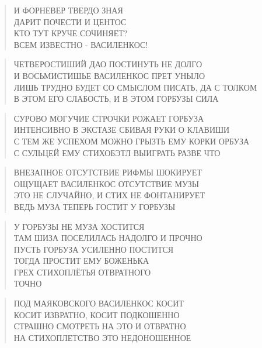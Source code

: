 \poemtitle{***}
\begin{verse}
И ФОРНЕВЕР ТВЕРДО ЗНАЯ\\
ДАРИТ ПОЧЕСТИ И ЦЕНТОС\\
КТО ТУТ КРУЧЕ СОЧИНЯЕТ?\\
ВСЕМ ИЗВЕСТНО - ВАСИЛЕНКОС!
\end{verse}

\poemtitle{***}
\begin{verse}
ЧЕТВЕРОСТИШИЙ ДАО ПОСТИНУТЬ НЕ ДОЛГО\\
И ВОСЬМИСТИШЬЕ ВАСИЛЕНКОС ПРЕТ УНЫЛО\\
ЛИШЬ ТРУДНО БУДЕТ СО СМЫСЛОМ ПИСАТЬ, ДА С ТОЛКОМ\\
В ЭТОМ ЕГО СЛАБОСТЬ, И В ЭТОМ ГОРБУЗЫ СИЛА
\end{verse}

\poemtitle{***}
\begin{verse}
СУРОВО МОГУЧИЕ СТРОЧКИ РОЖАЕТ ГОРБУЗА\\
ИНТЕНСИВНО В ЭКСТАЗЕ СБИВАЯ РУКИ О КЛАВИШИ\\
С ТЕМ ЖЕ УСПЕХОМ  МОЖНО ГРЫЗТЬ ЕМУ КОРКИ ОРБУЗА\\
С СУЛЬЦЕЙ ЕМУ СТИХОБЭТЛ ВЫИГРАТЬ РАЗВЕ ЧТО
\end{verse}

\poemtitle{***}
\begin{verse}
ВНЕЗАПНОЕ ОТСУТСТВИЕ РИФМЫ ШОКИРУЕТ\\
ОЩУЩАЕТ ВАСИЛЕНКОС ОТСУТСТВИЕ МУЗЫ\\
ЭТО НЕ СЛУЧАЙНО, И СТИХ НЕ ФОНТАНИРУЕТ\\
ВЕДЬ МУЗА ТЕПЕРЬ ГОСТИТ У ГОРБУЗЫ
\end{verse}

\poemtitle{***}
\begin{verse}
У ГОРБУЗЫ НЕ МУЗА ХОСТИТСЯ\\
ТАМ ШИЗА ПОСЕЛИЛАСЬ НАДОЛГО И ПРОЧНО\\
ПУСТЬ ГОРБУЗА УСИЛЕННО ПОСТИТСЯ\\
ТОГДА ПРОСТИТ ЕМУ БОЖЕНЬКА \\
           ГРЕХ СТИХОПЛЁТЬЯ ОТВРАТНОГО \\
                        ТОЧНО
\end{verse}

\poemtitle{***}
\begin{verse}
ПОД МАЯКОВСКОГО ВАСИЛЕНКОС КОСИТ\\
КОСИТ ИЗВРАТНО, КОСИТ ПОДКОШЕННО\\
СТРАШНО СМОТРЕТЬ НА ЭТО И ОТВРАТНО\\
НА СТИХОПЛЕТСТВО ЭТО НЕДОНОШЕННОЕ
\end{verse}

